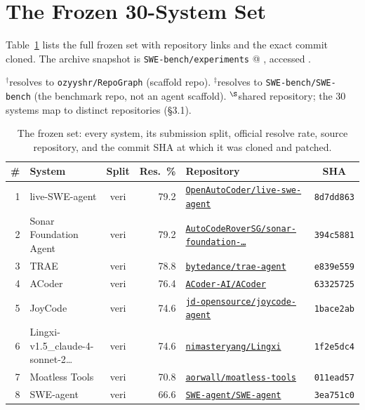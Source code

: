 \appendix
\sloppy
\clearpage
\section{The Frozen 30-System Set}
\label{app:set}
Table~\ref{tab:frozen} lists the full frozen set with repository links and the
exact commit cloned. The archive snapshot is
\texttt{SWE-bench/experiments} @ \texttt{\swArchiveSHA}, accessed \swAccessDate.

\begin{table}[h]\centering
\caption{The frozen set: every system, its submission split, official resolve
rate, source repository, and the commit SHA at which it was cloned and patched.}
\label{tab:frozen}\scriptsize
$^{\dagger}$resolves to \texttt{ozyyshr/RepoGraph} (scaffold repo). $^{\ddagger}$resolves to
\texttt{SWE-bench/SWE-bench} (the benchmark repo, not an agent scaffold). $^{\S}$shared
repository; the 30 systems map to \swDistinctRepos{} distinct repositories (\S3.1).\\[3pt]
\setlength{\tabcolsep}{3pt}
\begin{tabular}{rlcrlc}
\toprule
\# & System & Split & Res.\ \% & Repository & SHA \\
\midrule
1 & live-SWE-agent & veri & 79.2 & \href{https://github.com/OpenAutoCoder/live-swe-agent}{\texttt{OpenAutoCoder/live-swe-agent}} & \texttt{8d7dd863} \\
2 & Sonar Foundation Agent & veri & 79.2 & \href{https://github.com/AutoCodeRoverSG/sonar-foundation-agent}{\texttt{AutoCodeRoverSG/sonar-foundation-\ldots{}}} & \texttt{394c5881} \\
3 & TRAE & veri & 78.8 & \href{https://github.com/bytedance/trae-agent}{\texttt{bytedance/trae-agent}} & \texttt{e839e559} \\
4 & ACoder & veri & 76.4 & \href{https://github.com/ACoder-AI/ACoder}{\texttt{ACoder-AI/ACoder}} & \texttt{63325725} \\
5 & JoyCode & veri & 74.6 & \href{https://github.com/jd-opensource/joycode-agent}{\texttt{jd-opensource/joycode-agent}} & \texttt{1bace2ab} \\
6 & Lingxi-v1.5\_claude-4-sonnet-2\ldots{} & veri & 74.6 & \href{https://github.com/nimasteryang/Lingxi}{\texttt{nimasteryang/Lingxi}} & \texttt{1f2e5dc4} \\
7 & Moatless Tools & veri & 70.8 & \href{https://github.com/aorwall/moatless-tools}{\texttt{aorwall/moatless-tools}} & \texttt{011ead57} \\
8 & SWE-agent & veri & 66.6 & \href{https://github.com/SWE-agent/SWE-agent}{\texttt{SWE-agent/SWE-agent}} & \texttt{3ea751c0} \\

\end{tabular}
\end{table}
